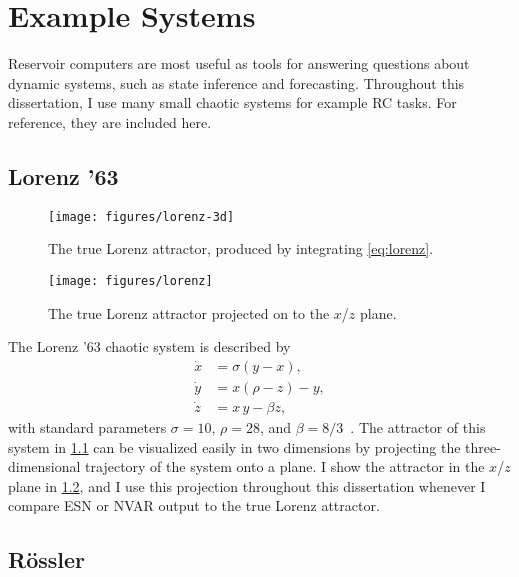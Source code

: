 \chapter{Example Systems}\label{ch:systems}

Reservoir computers are most useful as tools for answering questions
about dynamic systems, such as state inference and
forecasting. Throughout this dissertation, I use many small chaotic systems
for example RC tasks. For reference, they are included here.

\section{Lorenz '63}\label{sec:lorenz}

\begin{figure}
  \texttt{[image: figures/lorenz-3d]}
  \caption{The true Lorenz attractor, produced by integrating \cref{eq:lorenz}.}%
  \label{fig:lorenz-3d}
\end{figure}

\begin{figure}
  \texttt{[image: figures/lorenz]}
  \caption{The true Lorenz attractor projected on to the $x$/$z$ plane.}%
  \label{fig:lorenz}
\end{figure}

The Lorenz '63 chaotic system is described by
\begin{equation}
  \begin{aligned}
    \dot{x} &= \sigma \left(y - x\right), \\
    \dot{y} &= x \left(\rho - z\right) - y, \\
    \dot{z} &= x\,y - \beta z,
  \end{aligned}
  \label{eq:lorenz}
\end{equation}
with standard parameters $\sigma = 10$, $\rho = 28$, and $\beta = 8/3$~\cite{lorenz1963}. The attractor of this
system in \cref{fig:lorenz-3d} can be visualized easily in two dimensions by projecting the
three-dimensional trajectory of the system onto a plane. I show the
attractor in the $x$/$z$ plane in \cref{fig:lorenz}, and I use this projection throughout this dissertation whenever I compare ESN or NVAR output to the true Lorenz attractor.

\section{R{\"{o}}ssler}\label{sec:rossler}

